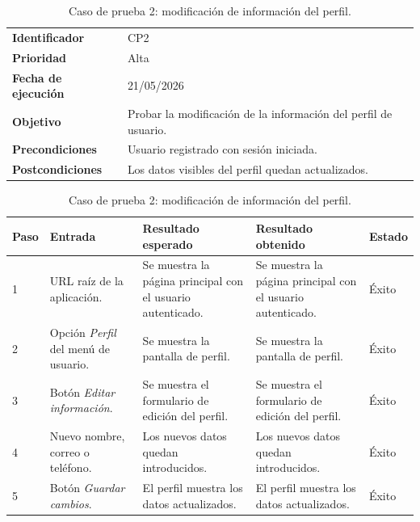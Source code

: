 \begin{table}[]
	\centering
	\footnotesize
	\renewcommand{\arraystretch}{1.2}
	\begin{tabularx}{\textwidth}{p{3.2cm} X}
		\toprule
		\textbf{Identificador} & CP2 \\
		\textbf{Prioridad} & Alta \\
		\textbf{Fecha de ejecución} & 21/05/2026 \\
		\textbf{Objetivo} & Probar la modificación de la información del perfil de usuario. \\
		\textbf{Precondiciones} & Usuario registrado con sesión iniciada. \\
		\textbf{Postcondiciones} & Los datos visibles del perfil quedan actualizados. \\
		\midrule
	\end{tabularx}
	\begin{tabularx}{\textwidth}{p{0.8cm} p{3.2cm} X X p{1.3cm}}
		\textbf{Paso} & \textbf{Entrada} & \textbf{Resultado esperado} & \textbf{Resultado obtenido} & \textbf{Estado} \\
		\midrule
		1 & URL raíz de la aplicación. & Se muestra la página principal con el usuario autenticado. & Se muestra la página principal con el usuario autenticado. & Éxito \\
		2 & Opción \textit{Perfil} del menú de usuario. & Se muestra la pantalla de perfil. & Se muestra la pantalla de perfil. & Éxito \\
		3 & Botón \textit{Editar información}. & Se muestra el formulario de edición del perfil. & Se muestra el formulario de edición del perfil. & Éxito \\
		4 & Nuevo nombre, correo o teléfono. & Los nuevos datos quedan introducidos. & Los nuevos datos quedan introducidos. & Éxito \\
		5 & Botón \textit{Guardar cambios}. & El perfil muestra los datos actualizados. & El perfil muestra los datos actualizados. & Éxito \\
		\bottomrule
	\end{tabularx}
	\caption{Caso de prueba 2: modificación de información del perfil.}
	\label{tab:cp2}
\end{table}

